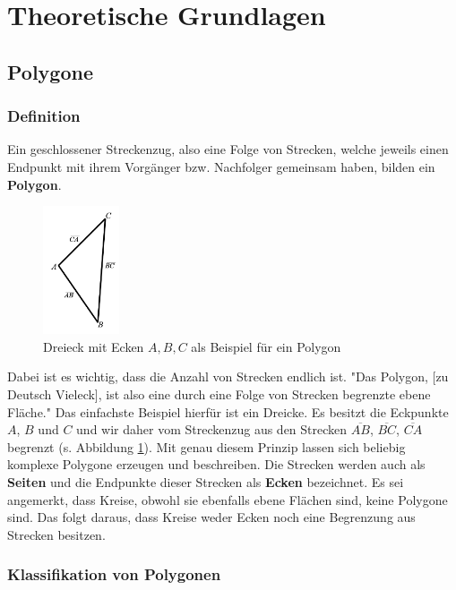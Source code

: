 \section{Theoretische Grundlagen}

\subsection{Polygone}
\subsubsection{Definition}

Ein geschlossener  Streckenzug, also eine Folge von Strecken, welche jeweils einen Endpunkt mit ihrem Vorgänger bzw. Nachfolger gemeinsam haben, bilden ein \textbf{Polygon}.

\begin{figure}
  \centering
  \includegraphics[width=0.2\textwidth]{bilder/dreieck_abc.png}
  \caption[Ein Dreieck als Beispiel für ein Polygon]{\centering Dreieck mit Ecken $A, B, C$ als Beispiel für ein Polygon}
  \label{fig:triangle}
\end{figure}

Dabei ist es wichtig, dass die Anzahl von Strecken endlich ist. "Das Polygon, [zu Deutsch Vieleck], ist also eine durch eine Folge von Strecken begrenzte ebene Fläche." \cite{polydef}
Das einfachste Beispiel hierfür ist ein Dreicke. Es besitzt die Eckpunkte $A$, $B$ und $C$ und wir daher vom Streckenzug aus den Strecken $\overline{AB}$, $\overline{BC}$, $\overline{CA}$ begrenzt (s. Abbildung \ref{fig:triangle}).
Mit genau diesem Prinzip lassen sich beliebig komplexe Polygone erzeugen und beschreiben. Die Strecken werden auch als \textbf{Seiten} und die Endpunkte dieser Strecken 
als \textbf{Ecken} bezeichnet. 
Es sei angemerkt, dass Kreise, obwohl sie ebenfalls ebene Flächen sind, keine Polygone sind. Das folgt daraus, dass Kreise weder Ecken noch eine Begrenzung aus Strecken besitzen.

\subsubsection{Klassifikation von Polygonen}

